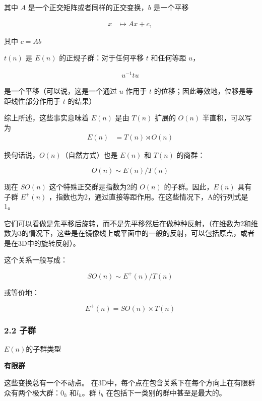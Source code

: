其中 $A$ 是一个正交矩阵或者同样的正交变换，$b$ 是一个平移

\begin{align}
x & \mapsto Ax + c,~
\end{align}

其中 $c = Ab$

$t(n)$ 是 $E(n)$ 的正规子群：对于任何平移 $t$ 和任何等距 $u$，

\begin{align}
u^{-1} tu~
\end{align}

是一个平移（可以说，这是一个通过 $u$ 作用于 $t$ 的位移；因此等效地，位移是等距线性部分作用于 $t$ 的结果）

综上所述，这些事实意味着 $E(n)$ 是由 $T(n)$ 扩展的 $O(n)$ 半直积，可以写为
\begin{align}
E(n) &= T(n) \rtimes O(n)~
\end{align}

换句话说，$O(n)$（自然方式）也是 $E(n)$ 和 $T(n)$ 的商群：

\begin{equation}
O(n) \sim E(n)/T(n)~
\end{equation}

现在 $SO(n)$ 这个特殊正交群是指数为2的 $O(n)$ 的子群。因此，$E(n)$ 具有子群 $E^{+}(n)$ ，指数也为2，通过直接等距作用。在这些情况下，A的行列式是1。

它们可以看做是先平移后旋转，而不是先平移然后在做种种反射，（在维数为2和维数为3的情况下，这些是在镜像线上或平面中的一般的反射，可以包括原点，或者是在3D中的旋转反射）。

这个关系一般写成：

\begin{equation}
SO(n) \sim E^+(n)/T(n)~
\end{equation}

或等价地：

\begin{equation}
E^{+}(n) = SO(n) \times T(n)~
\end{equation}



\subsubsection{2.2 子群}

$E(n)$的子群类型

\textbf{有限群}

这些变换总有一个不动点。 在3D中，每个点在包含关系下在每个方向上在有限群众有两个极大群：$0_h$ 和$l_h$。群 $l_h$ 在包括下一类别的群中甚至是最大的。

